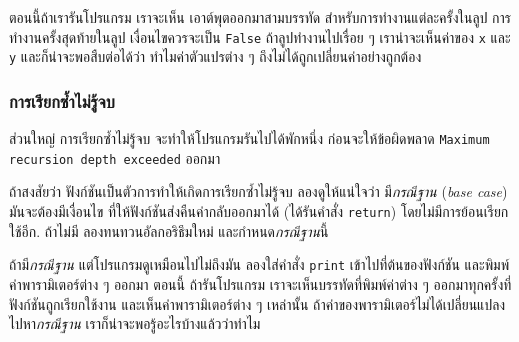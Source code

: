 ตอนนี้ถ้าเรารันโปรแกรม
เราจะเห็น เอาต์พุตออกมาสามบรรทัด สำหรับการทำงานแต่ละครั้งในลูป
การทำงานครั้งสุดท้ายในลูป เงื่อนไขควรจะเป็น \texttt{False}
ถ้าลูปทำงานไปเรื่อย ๆ
เราน่าจะเห็นค่าของ \texttt{x} และ \texttt{y}
และก็น่าจะพอสืบต่อได้ว่า ทำไมค่าตัวแปรต่าง ๆ ถึงไม่ได้ถูกเปลี่ยนค่าอย่างถูกต้อง


\subsubsection{การเรียกซ้ำไม่รู้จบ}


ส่วนใหญ่ การเรียกซ้ำไม่รู้จบ จะทำให้โปรแกรมรันไปได้พักหนึ่ง ก่อนจะให้ข้อผิดพลาด
\texttt{Maximum recursion depth exceeded} ออกมา


ถ้าสงสัยว่า ฟังก์ชันเป็นตัวการทำให้เกิดการเรียกซ้ำไม่รู้จบ
ลองดูให้แน่ใจว่า มี\textit{กรณีฐาน} (\textit{base case})
มันจะต้องมีเงื่อนไข ที่ให้ฟังก์ชันส่งคืนค่ากลับออกมาได้ (ได้รันคำสั่ง \texttt{return}) โดยไม่มีการย้อนเรียกใช้อีก.
ถ้าไม่มี ลองทนทวนอัลกอริธึมใหม่ และกำหนด\textit{กรณีฐาน}นี้


ถ้ามี\textit{กรณีฐาน}
แต่โปรแกรมดูเหมือนไปไม่ถึงมัน
ลองใส่คำสั่ง \texttt{print} เข้าไปที่ต้นของฟังก์ชัน และพิมพ์ค่าพารามิเตอร์ต่าง ๆ ออกมา
ตอนนี้ ถ้ารันโปรแกรม
เราจะเห็นบรรทัดที่พิมพ์ค่าต่าง ๆ ออกมาทุกครั้งที่ฟังก์ชันถูกเรียกใช้งาน
และเห็นค่าพารามิเตอร์ต่าง ๆ เหล่านั้น
ถ้าค่าของพารามิเตอร์ไม่ได้เปลี่ยนแปลงไปหา\textit{กรณีฐาน}
เราก็น่าจะพอรู้อะไรบ้างแล้วว่าทำไม


